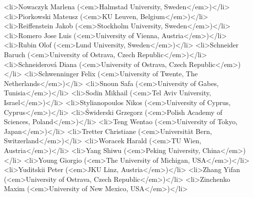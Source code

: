 <li>Nowaczyk Marlena (<em>Halmstad University, Sweden</em>)</li>
<li>Piorkowski Mateusz (<em>KU Leuven, Belgium</em>)</li>
<li>Reiffenstein Jakob (<em>Stockholm University, Sweden</em>)</li>
<li>Romero Jose Luis (<em>University of Vienna, Austria</em>)</li>
<li>Rubin Olof (<em>Lund University, Sweden</em>)</li>
<li>Schneider Baruch (<em>University of Ostrava, Czech Republic</em>)</li>
<li>Schneiderová Diana (<em>University of Ostrava, Czech Republic</em>)</li>
<li>Schwenninger Felix (<em>University of Twente, The Netherlands</em>)</li>
<li>Snoun Safa (<em>University of Gabes, Tunisia</em>)</li>
<li>Sodin Mikhail (<em>Tel Aviv University, Israel</em>)</li>
<li>Stylianopoulos Nikos (<em>University of Cyprus, Cyprus</em>)</li>
<li>Świderski Grzegorz (<em>Polish Academy of Sciences, Poland</em>)</li>
<li>Teng Wentao (<em>University of Tokyo, Japan</em>)</li>
<li>Tretter Christiane (<em>Universität Bern, Switzerland</em>)</li>
<li>Woracek Harald (<em>TU Wien, Austria</em>)</li>
<li>Yang Shiwu (<em>Peking University, China</em>)</li>
<li>Young Giorgio (<em>The University of Michigan, USA</em>)</li>
<li>Yuditskii Peter (<em>JKU Linz, Austria</em>)</li>
<li>Zhang Yifan (<em>University of Ostrava, Czech Republic</em>)</li>
<li>Zinchenko Maxim (<em>University of New Mexico, USA</em>)</li>
